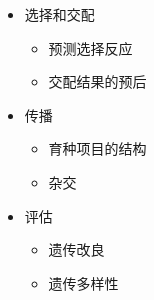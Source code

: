 \documentclass[serif,aspectratio=169]{beamer}
\begin{document}
\begin{frame}
\begin{columns}
\begin{column}{.32\textwidth}
      \begin{itemize}
      \item 选择和交配
        \begin{itemize}
        \item 预测选择反应
        \item 交配结果的预后
        \end{itemize}
      \item 传播
        \begin{itemize}
        \item 育种项目的结构
        \item 杂交
        \end{itemize}
      \item 评估
        \begin{itemize}
        \item 遗传改良
        \item 遗传多样性
        \end{itemize}
      \end{itemize}
    \end{column}
  \end{columns}
\end{frame}
\end{document}
